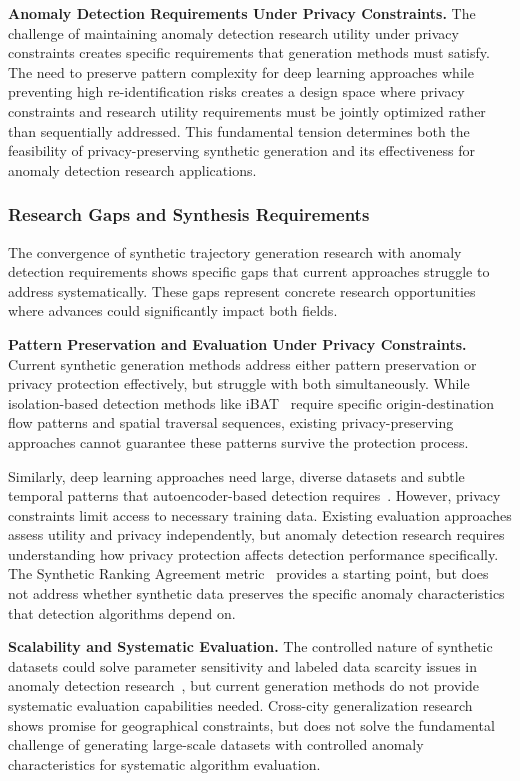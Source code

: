 \documentclass[runningheads]{llncs}
\begin{document}
\textbf{Anomaly Detection Requirements Under Privacy Constraints.} The challenge of maintaining anomaly detection research utility under privacy constraints creates specific requirements that generation methods must satisfy. The need to preserve pattern complexity for deep learning approaches while preventing high re-identification risks creates a design space where privacy constraints and research utility requirements must be jointly optimized rather than sequentially addressed. This fundamental tension determines both the feasibility of privacy-preserving synthetic generation and its effectiveness for anomaly detection research applications.

\subsubsection{Research Gaps and Synthesis Requirements}

The convergence of synthetic trajectory generation research with anomaly detection requirements shows specific gaps that current approaches struggle to address systematically. These gaps represent concrete research opportunities where advances could significantly impact both fields.

\textbf{Pattern Preservation and Evaluation Under Privacy Constraints.} Current synthetic generation methods address either pattern preservation or privacy protection effectively, but struggle with both simultaneously. While isolation-based detection methods like iBAT~\cite{zhang2019ibat} require specific origin-destination flow patterns and spatial traversal sequences, existing privacy-preserving approaches cannot guarantee these patterns survive the protection process.

Similarly, deep learning approaches need large, diverse datasets and subtle temporal patterns that autoencoder-based detection requires~\cite{huang2021lstm}. However, privacy constraints limit access to necessary training data. Existing evaluation approaches assess utility and privacy independently, but anomaly detection research requires understanding how privacy protection affects detection performance specifically. The Synthetic Ranking Agreement metric~\cite{jordon2019pate} provides a starting point, but does not address whether synthetic data preserves the specific anomaly characteristics that detection algorithms depend on.

\textbf{Scalability and Systematic Evaluation.} The controlled nature of synthetic datasets could solve parameter sensitivity and labeled data scarcity issues in anomaly detection research~\cite{zhang2019ibat}, but current generation methods do not provide systematic evaluation capabilities needed. Cross-city generalization research~\cite{wang2025gtg} shows promise for geographical constraints, but does not solve the fundamental challenge of generating large-scale datasets with controlled anomaly characteristics for systematic algorithm evaluation.
\end{document}
